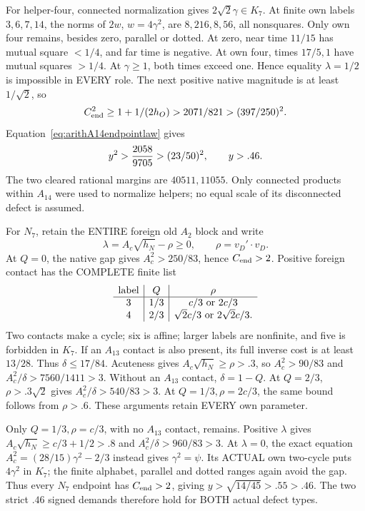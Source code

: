 \documentclass[11pt]{article}
\begin{document}
For helper-four, connected normalization
gives \(2\sqrt2\gamma\in K_7\).
At finite own labels \(3,6,7,14\), the
norms of \(2w\), \(w=4\gamma^2\), are
\(8,216,8,56\), all nonsquares.
Only own four remains, besides zero,
parallel or dotted.
At zero, near time \(11/15\) has mutual
square \(<1/4\), and far time is negative.
At own four, times \(17/5,1\) have mutual
squares \(>1/4\).
At \(\gamma\ge1\), both times exceed one.
Hence equality \(\lambda=1/2\) is impossible
in EVERY role.
The next positive native magnitude is
at least \(1/\sqrt2\), so
\[
 C_{\rm end}^2\ge1+1/(2h_O)>2071/821>(397/250)^2 .
\]
Equation~\eqref{eq:arithA14endpointlaw} gives
\[
                       y^2>{2058\over9705}>(23/50)^2,\qquad y>.46 .
\]
The two cleared rational margins are
\(40511,11055\).
Only connected products within \(A_{14}\)
were used to normalize helpers; no equal
scale of its disconnected defect is assumed.

For \(N_7\), retain the ENTIRE foreign
old \(A_2\) block and write
\[
 \lambda=A_c\sqrt{h_N}-\rho\ge0,\qquad
                              \rho=v_D'\cdot v_D .
\]
At \(Q=0\), the native gap gives
\(A_c^2>250/83\), hence \(C_{\rm end}>2\).
Positive foreign contact has the COMPLETE
finite list
\[
 \begin{array}{c|c|c}
 \text{label}&Q&\rho\\ \hline
 3&1/3&c/3\ \hbox{or }2c/3\\
 4&2/3&\sqrt2c/3\ \hbox{or }2\sqrt2c/3 .
 \end{array}
\]
Two contacts make a cycle; six is affine;
larger labels are nonfinite, and five is
forbidden in \(K_7\).
If an \(A_{13}\) contact is also present,
its full inverse cost is at least \(13/28\).
Thus \(\delta\le17/84\).
Acuteness gives \(A_c\sqrt{h_N}\ge\rho>.3\),
so \(A_c^2>90/83\) and
\(A_c^2/\delta>7560/1411>3\).
Without an \(A_{13}\) contact, \(\delta=1-Q\).
At \(Q=2/3\), \(\rho>.3\sqrt2\) gives
\(A_c^2/\delta>540/83>3\).
At \(Q=1/3,\rho=2c/3\), the same bound
follows from \(\rho>.6\).
These arguments retain EVERY own parameter.

Only \(Q=1/3,\rho=c/3\), with no
\(A_{13}\) contact, remains.
Positive \(\lambda\) gives
\(A_c\sqrt{h_N}\ge c/3+1/2>.8\)
and \(A_c^2/\delta>960/83>3\).
At \(\lambda=0\), the exact equation
\(A_c^2=(28/15)\gamma^2-2/3\) instead gives
\(\gamma^2=\psi\).
Its ACTUAL own two-cycle puts
\(4\gamma^2\) in \(K_7\);
the finite alphabet, parallel and dotted
ranges again avoid the gap.
Thus every \(N_7\) endpoint has \(C_{\rm end}>2\),
giving \(y>\sqrt{14/45}>.55>.46\).
The two strict \(.46\) signed demands
therefore hold for BOTH actual defect types.
\end{document}
